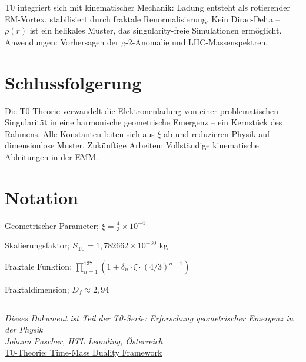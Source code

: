 \documentclass[12pt,a4paper]{article}
\begin{document}
	T0 integriert sich mit kinematischer Mechanik: Ladung entsteht als rotierender EM-Vortex, stabilisiert durch fraktale Renormalisierung. Kein Dirac-Delta – $\rho(r)$ ist ein helikales Muster, das singularity-freie Simulationen ermöglicht. Anwendungen: Vorhersagen der g-2-Anomalie und LHC-Massenspektren.
	
	\section{Schlussfolgerung}
	
	Die T0-Theorie verwandelt die Elektronenladung von einer problematischen Singularität in eine harmonische geometrische Emergenz – ein Kernstück des Rahmens. Alle Konstanten leiten sich aus $\xi$ ab und reduzieren Physik auf dimensionlose Muster. Zukünftige Arbeiten: Vollständige kinematische Ableitungen in der EMM.
	
	\appendix
	\section{Notation}
	\begin{description}[leftmargin=1cm]
		\item[$\xi$] Geometrischer Parameter; $\xi = \frac{4}{3} \times 10^{-4}$
		\item[$S_{\mathrm{T0}}$] Skalierungsfaktor; $S_{\mathrm{T0}} = 1{,}782662 \times 10^{-30}$ kg
		\item[$f_{\text{fractal}}$] Fraktale Funktion; $\prod_{n=1}^{137} (1 + \delta_n \cdot \xi \cdot (4/3)^{n-1})$
		\item[$D_f$] Fraktaldimension; $D_f \approx 2{,}94$
	\end{description}
	
	\begin{center}
		\hrule
		\vspace{0.5cm}
		\textit{Dieses Dokument ist Teil der T0-Serie: Erforschung geometrischer Emergenz in der Physik}\\
		\textit{Johann Pascher, HTL Leonding, Österreich}\\
		\vspace{0.3cm}
		\href{https://github.com/jpascher/T0-Time-Mass-Duality}{T0-Theorie: Time-Mass Duality Framework}
		\vspace{0.3cm}
	\end{center}
	
\end{document}
